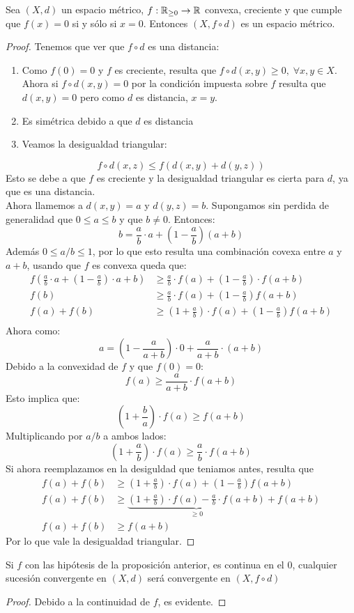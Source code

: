 \documentclass[12pt,a4paper]{book}
\begin{document}
\begin{prop}
Sea $(X,d)$ un espacio métrico, $f : \mathbb{R}_{\geq 0} \rightarrow \mathbb{R}$ convexa, creciente y que cumple que $f(x) = 0$ si y sólo si $x = 0$. Entonces $ (X, f \circ d)$ es un espacio métrico.
\begin{proof}
Tenemos que ver que $ f \circ d$ es una distancia:
\begin{enumerate}
\item Como $f(0) = 0$ y $f$ es creciente, resulta que $f \circ d (x,y) \geq 0, \;  \forall x,y \in X$.\\
Ahora si $f \circ d (x,y) = 0$ por la condición impuesta sobre $f$ resulta que $d(x,y) = 0$ pero como $d$ es distancia, $x = y$.
\item Es simétrica debido a que $d$ es distancia
\item Veamos la desigualdad triangular:
\end{enumerate}
$$ f \circ d (x,z) \leq f \left( d(x,y) + d(y,z) \right)$$
Esto se debe a que $f$ es creciente y la desigualdad triangular es cierta para $d$, ya que es una distancia.\\
Ahora llamemos a $d(x,y) = a$ y $d(y,z) = b$. Supongamos sin perdida de generalidad que $0 \leq a \leq b$ y que $b \neq 0$. Entonces:
$$ b = \frac{a}{b} \cdot a + \left(1 - \frac{a}{b} \right)(a+b)$$
Además $ 0 \leq a/b \leq 1$, por lo que esto resulta una combinación covexa entre $a$ y $a+b$, usando que $f$ es convexa queda que:
\begin{align*}
f\left(\frac{a}{b} \cdot a + \left(1- \frac{a}{b}\right) \cdot a+b \right) &\geq \frac{a}{b} \cdot f(a) + \left( 1 - \frac{a}{b} \right) \cdot f(a+b) \\
f(b) &\geq \frac{a}{b} \cdot f(a) + \left( 1 - \frac{a}{b} \right) f(a+b)\\
f(a)+f(b) &\geq \left(1 +\frac{a}{b} \right) \cdot f(a) + \left( 1 - \frac{a}{b} \right) f(a+b)\\
\end{align*}
Ahora como:
$$ a = \left( 1 - \frac{a}{a+b} \right) \cdot 0 + \frac{a}{a+b} \cdot (a+b)$$
Debido a la convexidad de $f$ y que $f(0) =0$:
$$ f(a) \geq \frac{a}{a+b} \cdot f(a+b)$$
Esto implica que:
$$ \left(1 + \frac{b}{a} \right) \cdot f(a) \geq f(a+b)$$
Multiplicando por $a/b$ a ambos lados:
$$\left(1 + \frac{a}{b} \right) \cdot f(a) \geq \frac{a}{b} \cdot f(a+b)$$
Si ahora reemplazamos en la desiguldad que teniamos antes, resulta que 
\begin{align*}
f(a)+f(b) &\geq \left(1 +\frac{a}{b} \right) \cdot f(a) + \left( 1 - \frac{a}{b} \right) f(a+b)\\
f(a)+f(b) &\geq \underbrace{\left(1 +\frac{a}{b} \right) \cdot f(a) - \frac{a}{b} \cdot f(a+b)}_{\geq 0} + f(a+b)\\
f(a)+f(b) &\geq f(a+b)
\end{align*}
Por lo que vale la desigualdad triangular.

\end{proof}
\end{prop}
\begin{prop}
Si $f$ con las hipótesis de la proposición anterior, es continua en el $0$, cualquier sucesión convergente en $(X,d)$ será convergente en $(X,f \circ d)$
\begin{proof}
Debido a la continuidad de $f$, es evidente.
\end{proof}
\end{prop}

\ifx\isEmbedded\undefined
\end{document}
